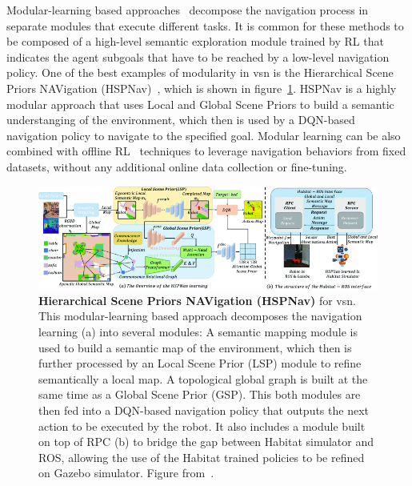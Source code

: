Modular-learning based approaches~\cite{chaplot2020, chang2020, skillfusion, Li2023RDDRLAR, zhou2022improving, Cai2024DGMemLV, Wang2023ProbableOL, Wasserman2023ExploitationGuidedEF, Yokoyama2023VLFMVF} decompose the navigation process in separate modules that execute different tasks.
It is common for these methods to be composed of a high-level semantic exploration module trained by RL that indicates the agent subgoals that have to be reached by a low-level navigation policy.
One of the best examples of modularity in \acrshort{vsn} is the Hierarchical Scene Priors NAVigation (HSPNav)~\cite{Kang2024HSPNavHS}, which is shown in figure~\ref{fig:modular-learning}.
HSPNav is a highly modular approach that uses Local and Global Scene Priors to build a semantic understanging of the environment, which then is used by a DQN-based~\cite{mnih2013} navigation policy to navigate to the specified goal.
Modular learning can be also combined with offline RL~\cite{shah2022} techniques to leverage navigation behaviors from fixed datasets, without any additional online data collection or fine-tuning.

\begin{figure}
    \centering
    \includegraphics[width=\textwidth]{figures/related_work/modular_learning}
    \caption{\textbf{Hierarchical Scene Priors NAVigation (HSPNav)} for \acrfull{vsn}.
    This modular-learning based approach decomposes the navigation learning (a) into several modules:
    A semantic mapping module is used to build a semantic map of the environment, which then is further processed by an Local Scene Prior (LSP) module to refine semantically a local map.
    A topological global graph is built at the same time as a Global Scene Prior (GSP).
    This both modules are then fed into a DQN-based navigation policy that outputs the next action to be executed by the robot.
    It also includes a module built on top of RPC (b) to bridge the gap between Habitat simulator and ROS, allowing the use of the Habitat trained policies to be refined on Gazebo simulator.
    Figure from~\cite{Kang2024HSPNavHS}.}
    \label{fig:modular-learning}
\end{figure}

